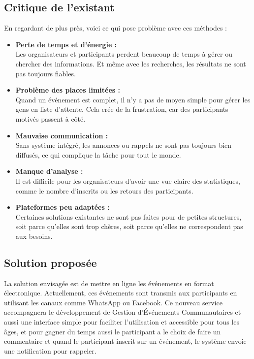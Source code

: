 \subsection{Critique de l’existant}
En regardant de plus près, voici ce qui pose problème avec ces méthodes :
\begin{itemize}[label=$\rightarrow$]
    \item \textbf{Perte de temps et d’énergie :} \\
    Les organisateurs et participants perdent beaucoup de temps à gérer ou chercher des informations. Et même avec les recherches, les résultats ne sont pas toujours fiables.
    \item \textbf{Problème des places limitées :} \\
    Quand un événement est complet, il n’y a pas de moyen simple pour gérer les gens en liste d’attente. Cela crée de la frustration, car des participants motivés passent à côté.
    \item \textbf{Mauvaise communication :} \\
    Sans système intégré, les annonces ou rappels ne sont pas toujours bien diffusés, ce qui complique la tâche pour tout le monde.
    \item \textbf{Manque d’analyse :} \\
    Il est difficile pour les organisateurs d’avoir une vue claire des statistiques, comme le nombre d’inscrits ou les retours des participants.
    \item \textbf{Plateformes peu adaptées :} \\
    Certaines solutions existantes ne sont pas faites pour de petites structures, soit parce qu’elles sont trop chères, soit parce qu’elles ne correspondent pas aux besoins.
\end{itemize}
\subsection{Solution proposée}
La solution envisagée est de mettre en ligne les événements en format électronique. Actuellement, ces événements sont transmis aux participants en utilisant les canaux comme WhatsApp ou Facebook. Ce nouveau service accompagnera le développement de Gestion d’Événements Communautaires et aussi une interface simple pour faciliter l'utilisation et accessible pour tous les âges, et pour gagner du temps aussi le participant a le choix de faire un commentaire 
et quand le participant inscrit sur un événement, le système envoie une notification pour rappeler.
